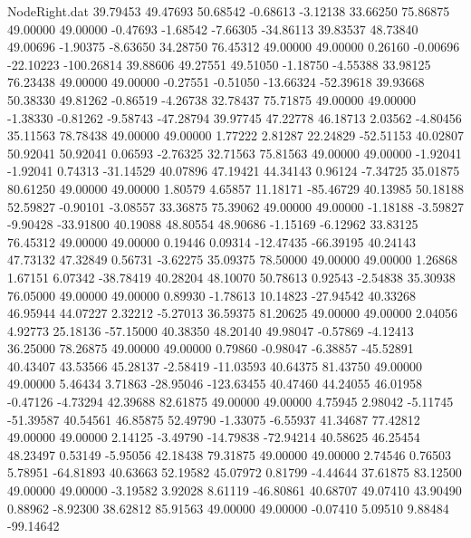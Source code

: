 \begin{filecontents}{NodeRight.dat}
  39.79453   49.47693   50.68542    -0.68613   -3.12138   33.66250   75.86875   49.00000   49.00000   -0.47693   -1.68542   -7.66305  -34.86113
  39.83537   48.73840   49.00696    -1.90375   -8.63650   34.28750   76.45312   49.00000   49.00000    0.26160   -0.00696  -22.10223 -100.26814
  39.88606   49.27551   49.51050    -1.18750   -4.55388   33.98125   76.23438   49.00000   49.00000   -0.27551   -0.51050  -13.66324  -52.39618
  39.93668   50.38330   49.81262    -0.86519   -4.26738   32.78437   75.71875   49.00000   49.00000   -1.38330   -0.81262   -9.58743  -47.28794
  39.97745   47.22778   46.18713     2.03562   -4.80456   35.11563   78.78438   49.00000   49.00000    1.77222    2.81287   22.24829  -52.51153
  40.02807   50.92041   50.92041     0.06593   -2.76325   32.71563   75.81563   49.00000   49.00000   -1.92041   -1.92041    0.74313  -31.14529
  40.07896   47.19421   44.34143     0.96124   -7.34725   35.01875   80.61250   49.00000   49.00000    1.80579    4.65857   11.18171  -85.46729
  40.13985   50.18188   52.59827    -0.90101   -3.08557   33.36875   75.39062   49.00000   49.00000   -1.18188   -3.59827   -9.90428  -33.91800
  40.19088   48.80554   48.90686    -1.15169   -6.12962   33.83125   76.45312   49.00000   49.00000    0.19446    0.09314  -12.47435  -66.39195
  40.24143   47.73132   47.32849     0.56731   -3.62275   35.09375   78.50000   49.00000   49.00000    1.26868    1.67151    6.07342  -38.78419
  40.28204   48.10070   50.78613     0.92543   -2.54838   35.30938   76.05000   49.00000   49.00000    0.89930   -1.78613   10.14823  -27.94542
  40.33268   46.95944   44.07227     2.32212   -5.27013   36.59375   81.20625   49.00000   49.00000    2.04056    4.92773   25.18136  -57.15000
  40.38350   48.20140   49.98047    -0.57869   -4.12413   36.25000   78.26875   49.00000   49.00000    0.79860   -0.98047   -6.38857  -45.52891
  40.43407   43.53566   45.28137    -2.58419  -11.03593   40.64375   81.43750   49.00000   49.00000    5.46434    3.71863  -28.95046 -123.63455
  40.47460   44.24055   46.01958    -0.47126   -4.73294   42.39688   82.61875   49.00000   49.00000    4.75945    2.98042   -5.11745  -51.39587
  40.54561   46.85875   52.49790    -1.33075   -6.55937   41.34687   77.42812   49.00000   49.00000    2.14125   -3.49790  -14.79838  -72.94214
  40.58625   46.25454   48.23497     0.53149   -5.95056   42.18438   79.31875   49.00000   49.00000    2.74546    0.76503    5.78951  -64.81893
  40.63663   52.19582   45.07972     0.81799   -4.44644   37.61875   83.12500   49.00000   49.00000   -3.19582    3.92028    8.61119  -46.80861
  40.68707   49.07410   43.90490     0.88962   -8.92300   38.62812   85.91563   49.00000   49.00000   -0.07410    5.09510    9.88484  -99.14642

\end{filecontents}
